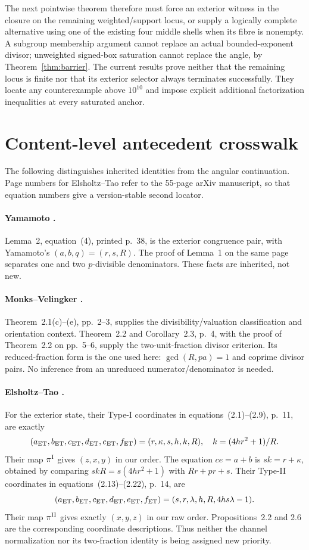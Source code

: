 \documentclass[11pt]{article}
\theoremstyle{definition}\newtheorem{definition}[theorem]{Definition}
\theoremstyle{remark}\newtheorem{remark}[theorem]{Remark}
\begin{document}
The next pointwise theorem therefore must force an exterior witness in the closure on the remaining weighted/support locus, or supply a logically complete alternative using one of the existing four middle shells when its fibre is nonempty. A subgroup membership argument cannot replace an actual bounded-exponent divisor; unweighted signed-box saturation cannot replace the angle, by Theorem~\ref{thm:barrier}. The current results prove neither that the remaining locus is finite nor that its exterior selector always terminates successfully. They locate any counterexample above $10^{10}$ and impose explicit additional factorization inequalities at every saturated anchor.

\section{Content-level antecedent crosswalk}\label{sec:antecedents}
The following distinguishes inherited identities from the angular continuation. Page numbers for Elsholtz--Tao refer to the 55-page arXiv manuscript, so that equation numbers give a version-stable second locator.

\paragraph{Yamamoto \cite{Yamamoto}.}
Lemma~2, equation~(4), printed p.~38, is the exterior congruence pair, with Yamamoto's $(a,b,q)=(r,s,R)$. The proof of Lemma~1 on the same page separates one and two $p$-divisible denominators. These facts are inherited, not new.

\paragraph{Monks--Velingker \cite{MV}.}
Theorem~2.1(c)--(e), pp.~2--3, supplies the divisibility/valuation classification and orientation context. Theorem~2.2 and Corollary~2.3, p.~4, with the proof of Theorem~2.2 on pp.~5--6, supply the two-unit-fraction divisor criterion. Its reduced-fraction form is the one used here: $\gcd(R,pa)=1$ and coprime divisor pairs. No inference from an unreduced numerator/denominator is needed.

\paragraph{Elsholtz--Tao \cite{ET}.}
For the exterior state, their Type-I coordinates in equations~(2.1)--(2.9), p.~11, are exactly
\[
 (a_{\rm ET},b_{\rm ET},c_{\rm ET},d_{\rm ET},e_{\rm ET},f_{\rm ET})
   =(r,\kappa,s,h,k,R),\quad k=(4hr^2+1)/R.
\]
Their map $\pi^{\rm I}$ gives $(z,x,y)$ in our order. The equation $ce=a+b$ is $sk=r+\kappa$, obtained by comparing $skR=s(4hr^2+1)$ with $Rr+pr+s$. Their Type-II coordinates in equations~(2.13)--(2.22), p.~14, are
\[
 (a_{\rm ET},b_{\rm ET},c_{\rm ET},d_{\rm ET},e_{\rm ET},f_{\rm ET})
  =(s,r,\lambda,h,R,4hs\lambda-1).
\]
Their map $\pi^{\rm II}$ gives exactly $(x,y,z)$ in our raw order. Propositions~2.2 and 2.6 are the corresponding coordinate descriptions. Thus neither the channel normalization nor its two-fraction identity is being assigned new priority.
\end{document}
